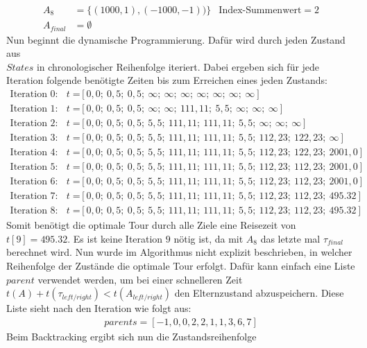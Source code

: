 \documentclass[german,version-2019-11]{uzl-thesis}
\begin{document}
\begin{example}
\begin{align*}
A_8&=\{(1000, 1), (-1000, -1))\} &\text{Index-Summenwert}=2\\
A_{final}&=\emptyset
\end{align*}
Nun beginnt die dynamische Programmierung. Dafür wird durch jeden Zustand aus \\$States$ in chronologischer Reihenfolge iteriert. Dabei ergeben sich für jede Iteration folgende benötigte Zeiten bis zum Erreichen eines jeden Zustands:
\begin{align*}
\text{Iteration 0:}~~~~t=&[0,0;~ 0,5;~ 0,5;~ \infty;~ \infty;~ \infty;~ \infty;~ \infty;~ \infty;~ \infty] \\
\text{Iteration 1:}~~~~t=&[0,0;~ 0,5;~ 0,5;~ \infty;~ \infty;~ 111,11;~ 5,5;~ \infty;~ \infty;~ \infty] \\
\text{Iteration 2:}~~~~t=&[0,0;~ 0,5;~ 0,5;~ 5,5;~ 111,11;~ 111,11;~ 5,5;~ \infty;~ \infty;~ \infty] \\
\text{Iteration 3:}~~~~t=&[0,0;~ 0,5;~ 0,5;~ 5,5;~ 111,11;~ 111,11;~ 5,5;~ 112,23;~ 122,23;~ \infty] \\
\text{Iteration 4:}~~~~t=&[0,0;~ 0,5;~ 0,5;~ 5,5;~ 111,11;~ 111,11;~ 5,5;~ 112,23;~ 122,23;~ 2001,0] \\
\text{Iteration 5:}~~~~t=&[0,0;~ 0,5;~ 0,5;~ 5,5;~ 111,11;~ 111,11;~ 5,5;~ 112,23;~ 112,23;~ 2001,0] \\
\text{Iteration 6:}~~~~t=&[0,0;~ 0,5;~ 0,5;~ 5,5;~ 111,11;~ 111,11;~ 5,5;~ 112,23;~ 112,23;~ 2001,0] \\
\text{Iteration 7:}~~~~t=&[0,0;~ 0,5;~ 0,5;~ 5,5;~ 111,11;~ 111,11;~ 5,5;~ 112,23;~ 112,23;~ 495.32] \\
\text{Iteration 8:}~~~~t=&[0,0;~ 0,5;~ 0,5;~ 5,5;~ 111,11;~ 111,11;~ 5,5;~ 112,23;~ 112,23;~ 495.32]
\end{align*}
Somit benötigt die optimale Tour durch alle Ziele eine Reisezeit von $t[9]=495.32$. Es ist keine Iteration $9$ nötig ist, da mit $A_{8}$ das letzte mal $\tau_{final}$ berechnet wird. Nun wurde im Algorithmus nicht explizit beschrieben, in welcher Reihenfolge der Zustände die optimale Tour erfolgt. Dafür kann einfach eine Liste $parent$ verwendet werden, um bei einer schnelleren Zeit {$t(A) + t(\tau_{left/right}) < t(A_{left/right})$} den Elternzustand abzuspeichern. Diese Liste sieht nach den Iteration wie folgt aus:
\begin{align*}
parents = [-1, 0, 0, 2, 2, 1, 1, 3, 6, 7]
\end{align*}
Beim Backtracking ergibt sich nun die Zustandsreihenfolge
\begin{align*}

\end{align*}
\end{example}
\end{document}
